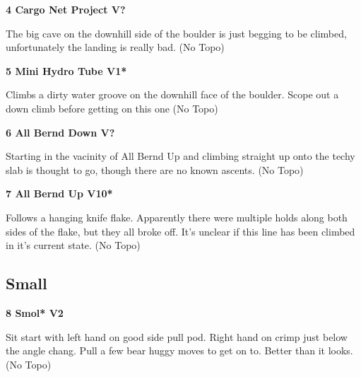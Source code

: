 \begin{multicols}{2}
\needspace{1.5cm}
\label{rt:Cargo Net Project}
\colorbox{black!20}{
\parbox{0.95\linewidth}{
\textbf{
4 Cargo Net Project V?  
}}}

\begin{adjustwidth}{0.5cm}{}			
The big cave on the downhill side of the boulder is just begging to be climbed, unfortunately the landing is really bad. (No Topo)
\end{adjustwidth}



\needspace{1.5cm}
\label{rt:Mini Hydro Tube}
\colorbox{green!20}{
\parbox{0.95\linewidth}{
\textbf{
5 Mini Hydro Tube V1*  \warn
}}}

\begin{adjustwidth}{0.5cm}{}			
Climbs a dirty water groove on the downhill face of the boulder. Scope out a down climb before getting on this one (No Topo)
\end{adjustwidth}



\needspace{1.5cm}
\label{rt:All Bernd Down}
\colorbox{black!20}{
\parbox{0.95\linewidth}{
\textbf{
6 All Bernd Down V?  
}}}

\begin{adjustwidth}{0.5cm}{}			
Starting in the vacinity of All Bernd Up and climbing straight up onto the techy slab is thought to go, though there are no known ascents. (No Topo)
\end{adjustwidth}



\needspace{1.5cm}
\label{rt:All Bernd Up}
\colorbox{red!20}{
\parbox{0.95\linewidth}{
\textbf{
7 All Bernd Up V10*  
}}}

\begin{adjustwidth}{0.5cm}{}			
Follows a hanging knife flake. Apparently there were multiple holds along both sides of the flake, but they all broke off. It's unclear if this line has been climbed in it's current state. (No Topo)
\end{adjustwidth}




\needspace{1.5cm}
\subsection*{Small}\label{bf:Small}
	


\needspace{1.5cm}
\label{rt:Smol}
\colorbox{green!20}{
\parbox{0.95\linewidth}{
\textbf{
8 Smol* V2  
}}}

\begin{adjustwidth}{0.5cm}{}			
Sit start with left hand on good side pull pod. Right hand on crimp just below the angle chang. Pull a few bear huggy moves to get on to. Better than it looks. (No Topo)
\end{adjustwidth}





\end{multicols}
